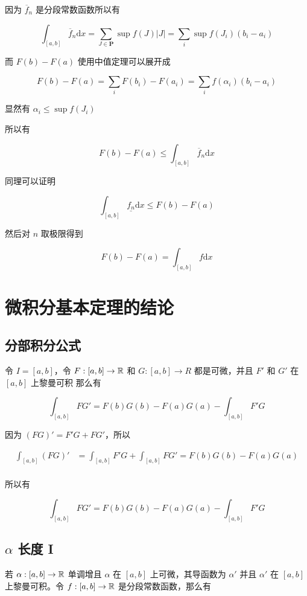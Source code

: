 因为 $\overline{f}_n$ 是分段常数函数所以有

\[
\int_{[a,b]}\overline{f}_n \mathrm{d}x = \sum_{J \in \mathbf{P}}\sup f(J) \lvert J \rvert = \sum_{i}\sup f(J_i) (b_i -a_i)
\]

而 $F(b) - F(a)$ 使用中值定理可以展开成

\[
F(b) - F(a) = \sum_{i} F(b_i) - F(a_i) = \sum_{i} f(\alpha_i)(b_i - a_i)
\]

显然有 $\alpha_i \le \sup f(J_i)$

所以有 


\[
F(b) - F(a) \le \int_{[a,b]}\overline{f}_n \mathrm{d}x
\]

同理可以证明


\[
\int_{[a,b]}\underline{f_n} \mathrm{d}x \le F(b) - F(a) 
\]

然后对 $n$ 取极限得到

\[
F(b) - F(a) = \int_{[a,b]}f \mathrm{d}x
\]

\section{微积分基本定理的结论}

\subsection{分部积分公式}

令 $I = [a,b]$，令 $F: [a,b] \to \mathbb{R}$ 和 $G: [a,b] \to R$ 都是可微，并且 $F'$ 和 $G'$
在 $[a,b]$ 上黎曼可积
那么有

\[
\int_{[a,b]}FG' = F(b)G(b) - F(a)G(a) - \int_{[a,b]}F'G
\]

因为 $(FG)'= F'G + FG'$，所以

\begin{align*}
\int_{[a,b]}(FG)' &= \int_{[a,b]}F'G + \int_{[a,b]}FG' = F(b)G(b) - F(a)G(a) \\
\end{align*}

所以有

\[
\int_{[a,b]}FG' = F(b)G(b) - F(a)G(a) - \int_{[a,b]}F'G
\]

\subsection{$\alpha$ 长度 I}

若 $\alpha: [a,b] \to \mathbb{R}$ 单调增且 $\alpha$ 在 $[a,b]$ 上可微，其导函数为 $\alpha'$ 并且 $\alpha'$
在 $[a,b]$ 上黎曼可积。令 $f: [a,b ] \to \mathbb{R}$ 是分段常数函数，那么有

